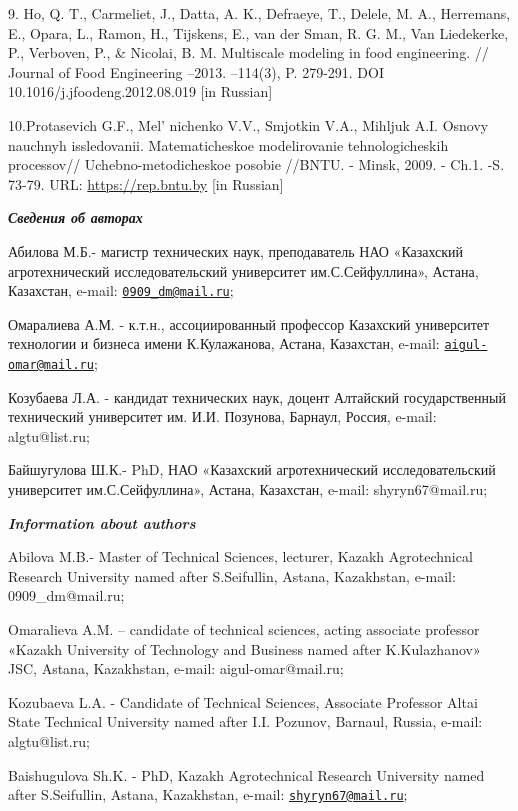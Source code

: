 \begin{references}
9. Ho, Q. T., Carmeliet, J., Datta, A. K., Defraeye, T., Delele, M. A.,
Herremans, E., Opara, L., Ramon, H., Tijskens, E., van der Sman, R. G.
M., Van Liedekerke, P., Verboven, P., \& Nicolai, B. M. Multiscale
modeling in food engineering. // Journal of Food Engineering --2013.
--114(3), P. 279-291. DOI \\10.1016/j.jfoodeng.2012.08.019 {[}in
Russian{]}

10.Protasevich G.F., Mel' nichenko V.V., Smjotkin V.A.,
Mihljuk A.I. Osnovy nauchnyh issledovanii. Matematicheskoe modelirovanie
tehnologicheskih processov// Uchebno-metodicheskoe posobie //BNTU. -
Minsk, 2009. - Ch.1. -S. 73-79. URL: \href{https://rep.bntu.by/handle/data/5233}{https://rep.bntu.by} {[}in Russian{]}
\end{references}

\begin{authorinfo}
\hspace{1em}\emph{{\bfseries Сведения об авторах}}

Абилова М.Б.- магистр технических наук, преподаватель НАО «Казахский
агротехнический исследовательский университет им.С.Сейфуллина», Астана,
Казахстан, e-mail:
\href{mailto:0909_dm@mail.ru}{\nolinkurl{0909\_dm@mail.ru}};

Омаралиева А.М. - к.т.н., ассоциированный профессор Казахский
университет технологии и бизнеса имени К.Кулажанова, Астана, Казахстан,
e-mail:
\href{mailto:aigul-omar@mail.ru}{\nolinkurl{aigul-omar@mail.ru}};

Козубаева Л.А. - кандидат технических наук, доцент Алтайский
государственный технический университет им. И.И. Позунова, Барнаул,
Россия, e-mail: algtu@list.ru;

Байшугулова Ш.К.- PhD, НАО «Казахский агротехнический исследовательский
университет им.С.Сейфуллина», Астана, Казахстан, e-mail:
shyryn67@mail.ru;

\hspace{1em}\emph{{\bfseries Information about authors}}

Abilova M.B.- Master of Technical Sciences, lecturer, Kazakh
Agrotechnical Research University named after S.Seifullin, Astana,
Kazakhstan, e-mail: 0909\_dm@mail.ru;

Omaralieva A.M. -- candidate of technical sciences, acting associate
professor «Kazakh University of Technology and Business named after
K.Kulazhanov» JSC, Astana, Kazakhstan, e-mail: aigul-omar@mail.ru;

Kozubaeva L.A. - Candidate of Technical Sciences, Associate Professor
Altai State Technical University named after I.I. Pozunov, Barnaul,
Russia, e-mail: algtu@list.ru;

Baishugulova Sh.K. - PhD, Kazakh Agrotechnical Research University named
after S.Seifullin, Astana, Kazakhstan, e-mail:
\href{mailto:shyryn67@mail.ru}{\nolinkurl{shyryn67@mail.ru}};
\end{authorinfo}
